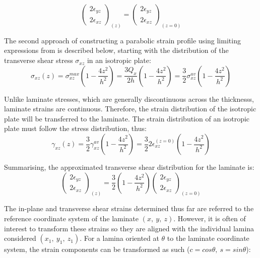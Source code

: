 \begin{equation} 
\begin{pmatrix}
2\epsilon_{yz} \\
2\epsilon_{xz}
\end{pmatrix}_{(z)}
=
\begin{pmatrix}
2\epsilon_{yz} \\
2\epsilon_{xz}
\end{pmatrix}_{(z=0)}
\label{eqscomp_strain_recovery3}
\end{equation}

The second approach of constructing a parabolic strain profile using limiting expressions from \cite{FelippaKirchhoff2017} is described below, starting with the distribution of the transverse shear stress $\sigma_{xz}$ in an isotropic plate:
\begin{equation} 
\sigma_{xz} (z) = \sigma_{xz}^{max} (1-\frac{4z^2}{h^2})  = \frac{3Q_x}{2h} (1-\frac{4z^2}{h^2}) = \frac{3}{2} \sigma_{xz}^{av} (1-\frac{4z^2}{h^2})
\label{eqscomp_strain_recovery4}
\end{equation}

Unlike laminate stresses, which are generally discontinuous across the thicknesss, laminate strains are continuous. Therefore, the strain distribution of the isotropic plate will be transferred to the laminate.
The strain distribution of an isotropic plate must follow the stress distribution, thus:
\begin{equation} 
\gamma_{xz} (z)=  \frac{3}{2} \gamma_{xz}^{av} (1-\frac{4z^2}{h^2}) = \frac{3}{2} 2\epsilon_{xz}^{(z=0)} (1-\frac{4z^2}{h^2})
\label{eqscomp_strain_recovery5}
\end{equation}

Summarising, the approximated transverse shear distribution for the laminate is:
\begin{equation} 
\begin{pmatrix}
2\epsilon_{yz} \\
2\epsilon_{xz}
\end{pmatrix}_{(z)}
=
\frac{3}{2} (1-\frac{4z^2}{h^2})
\begin{pmatrix}
2\epsilon_{yz} \\
2\epsilon_{xz}
\end{pmatrix}_{(z=0)}
\label{eqscomp_strain_recovery6}
\end{equation}

The in-plane and transverse shear strains determined thus far are referred to the reference coordinate system of the laminate $(x,\ y,\ z)$. However, it is often of interest to transform these strains so they are aligned with the individual lamina considered $(x_1,\ y_1,\ z_1)$. For a lamina oriented at $\theta$ to the laminate coordinate system, the strain components can be transformed as such ($c = cos\theta,\ s = sin\theta$):

